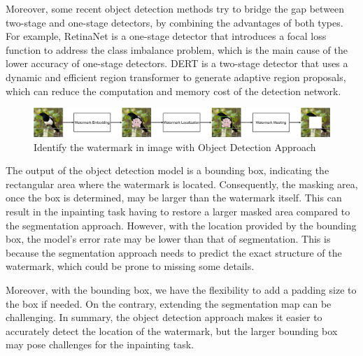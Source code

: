 Moreover, some recent object detection methods try to bridge the gap between two-stage and one-stage detectors, by combining the advantages of both types. For example, RetinaNet \cite{lin2017focal} is a one-stage detector that introduces a focal loss function to address the class imbalance problem, which is the main cause of the lower accuracy of one-stage detectors. DERT \cite{carion2020end} is a two-stage detector that uses a dynamic and efficient region transformer to generate adaptive region proposals, which can reduce the computation and memory cost of the detection network.
\begin{figure}[t]
 \centering
 \includegraphics[width=\linewidth]{img/detection.png}

 \caption{Identify the watermark in image with Object Detection Approach}
 \label{figure:detection}
\end{figure}

The output of the object detection model is a bounding box, indicating the rectangular area where the watermark is located. Consequently, the masking area, once the box is determined, may be larger than the watermark itself. This can result in the inpainting task having to restore a larger masked area compared to the segmentation approach. However, with the location provided by the bounding box, the model's error rate may be lower than that of segmentation. This is because the segmentation approach needs to predict the exact structure of the watermark, which could be prone to missing some details.

Moreover, with the bounding box, we have the flexibility to add a padding size to the box if needed. On the contrary, extending the segmentation map can be challenging. In summary, the object detection approach makes it easier to accurately detect the location of the watermark, but the larger bounding box may pose challenges for the inpainting task.

